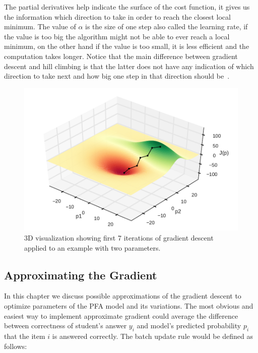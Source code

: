 The partial derivatives help indicate the surface of the cost function, it gives us the information which direction to take in order to reach the closest local minimum. The value of $\alpha$ is the size of one step also called the learning rate, if the value is too big the algorithm might not be able to ever reach a local minimum, on the other hand if the value is too small, it is less efficient and the computation takes longer. Notice that the main difference between gradient descent and hill climbing is that the latter does not have any indication of which direction to take next and how big one step in that direction should be~\cite{Russell2009}.

\begin{figure}[htbp]
  \centering
  \includegraphics[width=\textwidth]{img/gradient-descent}
  \caption{3D visualization showing first 7 iterations of gradient descent applied to an example with two parameters.}
  \label{fig-gradient-descent}
\end{figure}

\subsection{Approximating the Gradient}

In this chapter we discuss possible approximations of the gradient descent to optimize parameters of the PFA model and its variations. The most obvious and easiest way to implement approximate gradient could average the difference between correctness of student's answer $y_i$ and model's predicted probability $p_i$ that the item $i$ is answered correctly. The batch update rule would be defined as follows:

